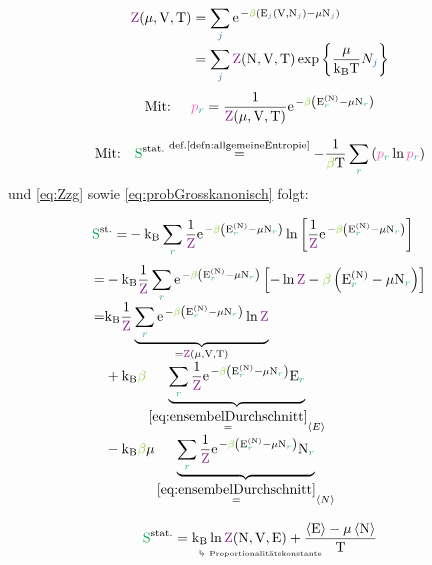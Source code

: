 \begin{emphbox}\nospacing
  \begin{law}\leavevmode\\
    \begin{align}
      \Zzg&=\sum_{\idxj}\e^{-\betac \left(\Ez_{\idxj}(\Vz,\Nz_{\idxj})-\muz\Nz_{\idxj}\right)}\nonumber\nalign
      &=\sum_{\idxj}\Zzk\exp\left\{\frac{\muz}{\kb\Tz}N_{\idxj}\right\}\label{eq:Zzg}
    \end{align}
    \begin{align}
      &\text{Mit: }&\pb_{\idxr}=\frac{1}{\Zzg}\e^{-\betac\left(\Ez_{\idxr}^{(\Nz)}-\muz\Nz_{\idxr}\right)}\label{eq:probGrosskanonisch}
    \end{align}
  \end{law}
\end{emphbox}
	\vfill\columnbreak
\begin{sectionbox}\nospacing
  \begin{align*}
    &\text{Mit:}&\Spots\eqs{\text{def.\ref{defn:allgemeineEntropie}}}-\frac{1}{\betac\Tz}\sum_{\idxr}\left(\pbr\ln\pbr\right)
  \end{align*}
  und \cref{eq:Zzg} sowie \cref{eq:probGrosskanonisch} folgt:
\end{sectionbox}
\begin{sectionbox}\nospacing
  \begin{align*}
    \Spot^{\text{st.}}=&-\kb\sum_{\idxr}\frac{1}{\Zz}\e^{-\betac\left(\Ez_{\idxr}^{(\Nz)}-\muz\Nz_{\idxr}\right)}\ln \left[\frac{1}{\Zz}\e^{-\betac\left(\Ez_{\idxr}^{(\Nz)}-\muz\Nz_{\idxr}\right)}\right]
  \end{align*}
  \begin{align*}
    =&-\kb\frac{1}{\Zz}\sum_{\idxr}\e^{-\betac\left(\Ez_{\idxr}^{(\Nz)}-\muz\Nz_{\idxr}\right)}\left[-\ln\Zz-\betac\left(\Ez_{\idxr}^{(\Nz)}-\muz\Nz_{\idxr}\right)\right]\nalign
       =&\kb\frac{1}{\Zz}\underbrace{\sum_{\idxr}\e^{-\betac\left(\Ez_{\idxr}^{(\Nz)}-\muz\Nz_{\idxr}\right)}\ln\Zz}_{=\Zzg}\nalign
          &+\kb\betac\underbrace{\sum_{\idxr}\frac{1}{\Zz}\e^{-\betac\left(\Ez_{\idxr}^{(\Nz)}-\muz\Nz_{\idxr}\right)}\Ezr}_{\eqs{\cref{eq:ensembelDurchschnitt}}\obs{E}}\nalign
          &-\kb\betac\muz\underbrace{\sum_{\idxr}\frac{1}{\Zz}\e^{-\betac\left(\Ez_{\idxr}^{(\Nz)}-\muz\Nz_{\idxr}\right)}\Nz_{\idxr}}_{\eqs{\cref{eq:ensembelDurchschnitt}}\obs{N}}
  \end{align*}
\end{sectionbox}
\begin{defnbox}\nospacing
  \begin{defn}\label{defn:EntropieKanonisch}
    \begin{equation}
      \Spots=\bdra{\kb}{\normalfont{Proportionalitätskonstante}}\ln\Zzm+\frac{\obs{\Ez}-\muz\obs{\Nz}}{\Tz}
    \end{equation}
  \end{defn}
\end{defnbox}

